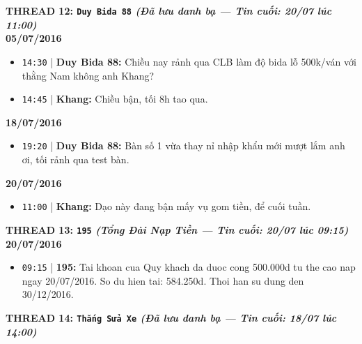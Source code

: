 \documentclass[12pt,a4paper]{article}
\begin{document}
\vspace{0.3cm}\noindent\textbf{\large  THREAD 12: \texttt{Duy Bida 88} \textit{(Đã lưu danh bạ — Tin cuối: 20/07 lúc 11:00)}}\\[0.15cm]


\textbf{05/07/2016}

\begin{itemize}[leftmargin=*, itemsep=2pt, topsep=2pt, parsep=0pt]
  \item \texttt{14:30} | \textbf{Duy Bida 88:} Chiều nay rảnh qua CLB làm độ bida lỗ 500k/ván với thằng Nam không anh Khang?
  \item \texttt{14:45} | \textbf{Khang:} Chiều bận, tối 8h tao qua.

\end{itemize}
\textbf{18/07/2016}

\begin{itemize}[leftmargin=*, itemsep=2pt, topsep=2pt, parsep=0pt]
  \item \texttt{19:20} | \textbf{Duy Bida 88:} Bàn số 1 vừa thay nỉ nhập khẩu mới mượt lắm anh ơi, tối rảnh qua test bàn.

\end{itemize}
\textbf{20/07/2016}

\begin{itemize}[leftmargin=*, itemsep=2pt, topsep=2pt, parsep=0pt]
  \item \texttt{11:00} | \textbf{Khang:} Dạo này đang bận mấy vụ gom tiền, để cuối tuần.


\end{itemize}

\vspace{0.3cm}\noindent\textbf{\large  THREAD 13: \texttt{195} \textit{(Tổng Đài Nạp Tiền — Tin cuối: 20/07 lúc 09:15)}}\\[0.15cm]


\textbf{20/07/2016}

\begin{itemize}[leftmargin=*, itemsep=2pt, topsep=2pt, parsep=0pt]
  \item \texttt{09:15} | \textbf{195:} Tai khoan cua Quy khach da duoc cong 500.000d tu the cao nap ngay 20/07/2016. So du hien tai: 584.250d. Thoi han su dung den 30/12/2016.


\end{itemize}

\vspace{0.3cm}\noindent\textbf{\large  THREAD 14: \texttt{Thắng Sửa Xe} \textit{(Đã lưu danh bạ — Tin cuối: 18/07 lúc 14:00)}}\\[0.15cm]
\end{document}
